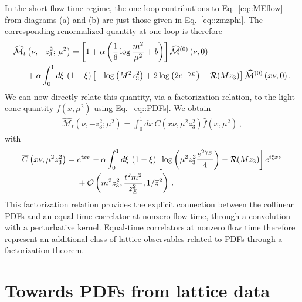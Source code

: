 In the short flow-time regime, the one-loop contributions to Eq.~\eqref{eq::MEflow} from diagrams (a) and (b) are just those given in Eq.~\eqref{eq::zmzphi}. The corresponding
renormalized quantity at one loop is therefore
\begin{align}
\label{eq::tIoffe1loopren}
    \widehat{\mathcal{M}}_t&\left(\nu, -z_3^2;\,\mu^2\right) =
    \left[1+ \alpha\left(\frac{1}{6}\log\frac{m^2}{\mu^2} + b\right)  \right]\widehat{\mathcal{M}}^{(0)}\left(\nu, 0\right) \nonumber \\
    &+\alpha \int_0^1 d\xi\,\left(1-\xi\right)
    \left[-\log\left( M^2 z_3^2\right)+ 2 \log\left(2e^{-\gamma_E}\right) + {\cal R}(Mz_3)\right] \widehat{\mathcal{M}}^{(0)}\left(x \nu, 0\right) .
\end{align}
We can now directly relate this quantity, via a factorization relation, to the light-cone quantity $f(x,\mu^2)$ using Eq.~\eqref{eq::PDFs}. We obtain
\begin{align}
	\label{eq::factt}
	\widehat{\mathcal{M}}_t\left(\nu, -z_3^2; \mu^2\right) = 
	\int_{0}^{1} dx\,\overline{C}\left(x\nu, \mu^2 z_3^2 \right) \widehat{f}\left(x,\mu^2\right)\, ,
\end{align}
with
\begin{align}
	\label{eq::Cpseudot}
	\overline{C}\left(x\nu,\mu^2 z_3^2 \right) = {} & 
	 e^{i x\nu} - \alpha\int_0^1 d\xi \, 
	 \left(1-\xi\right) \left[
	 \log\left( \mu^2 z_3^2\frac{e^{2\gamma_E}}{4} \right) - {\cal R}(Mz_3)\right] e^{i \xi x\nu} \nonumber \\
         & {} + \mathcal{O}\left(m^2 z_3^2,\frac{t^2 m^2}{z_E^2},
                1/\overline{z}^2\right)\, .
\end{align}
This factorization relation provides the explicit connection between the collinear PDFs and an
equal-time correlator at nonzero flow time, through a convolution with a perturbative kernel.
Equal-time correlators at nonzero flow time therefore represent an additional class of lattice
observables related to PDFs through a factorization theorem.

  
\section{Towards PDFs from lattice data}
\label{sec:conclusions_scalar}

